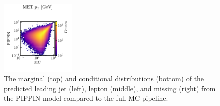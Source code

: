\begin{figure}[htb]
    \includegraphics[clip, trim=0cm 0cm 0cm 2.5cm, width=0.32\textwidth]{Figures/jet_generation/pippin/marginals_2D/marginal2D_met_pt.pdf}
    \caption{
        The marginal (top) and conditional distributions (bottom) of the predicted leading jet (left), lepton (middle), and missing \pt (right) from the PIPPIN model compared to the full MC pipeline.
    }
    \label{fig:pippin_jet}
\end{figure}

